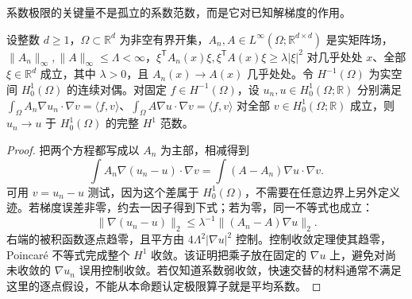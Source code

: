 系数极限的关键量不是孤立的系数范数，而是它对已知解梯度的作用。
\begin{proposition}[逐点系数极限下的能量稳定性]
\label{b2:prop:15-ae-coefficient-stability}
设整数 \(d\geq1\)，\(\Omega\subset\mathbb R^d\) 为非空有界开集，\(A_n,A\in L^\infty(\Omega;\mathbb R^{d\times d})\) 是实矩阵场，\(\|A_n\|_\infty,\|A\|_\infty\leq\Lambda<\infty\)，\(\xi^{\mathsf T}A_n(x)\xi,\xi^{\mathsf T}A(x)\xi\geq\lambda|\xi|^2\) 对几乎处处 \(x\)、全部 \(\xi\in\mathbb R^d\) 成立，其中 \(\lambda>0\)，且 \(A_n(x)\to A(x)\) 几乎处处。令 \(H^{-1}(\Omega)\) 为实空间 \(H_0^1(\Omega)\) 的连续对偶。对固定 \(f\in H^{-1}(\Omega)\)，设 \(u_n,u\in H_0^1(\Omega;\mathbb R)\) 分别满足 \(\int_\Omega A_n\nabla u_n\cdot\nabla v=\langle f,v\rangle\)、\(\int_\Omega A\nabla u\cdot\nabla v=\langle f,v\rangle\) 对全部 \(v\in H_0^1(\Omega;\mathbb R)\) 成立，则 \(u_n\to u\) 于 \(H_0^1(\Omega)\) 的完整 \(H^1\) 范数。
\end{proposition}
\begin{proof}
把两个方程都写成以 \(A_n\) 为主部，相减得到
\[\int A_n\nabla(u_n-u)\cdot\nabla v
 =\int(A-A_n)\nabla u\cdot\nabla v.\]
可用 \(v=u_n-u\) 测试，因为这个差属于 \(H_0^1(\Omega)\)，不需要在任意边界上另外定义迹。若梯度误差非零，约去一因子得到下式；若为零，同一不等式也成立：
\[\|\nabla(u_n-u)\|_2\le\lambda^{-1}\|(A_n-A)\nabla u\|_2.\]
右端的被积函数逐点趋零，且平方由 \(4\Lambda^2|\nabla u|^2\) 控制。控制收敛定理使其趋零，Poincaré 不等式完成整个 \(H^1\) 收敛。该证明把乘子放在固定的 \(\nabla u\) 上，避免对尚未收敛的 \(\nabla u_n\) 误用控制收敛。若仅知道系数弱收敛，快速交替的材料通常不满足这里的逐点假设，不能从本命题认定极限算子就是平均系数。
\end{proof}

